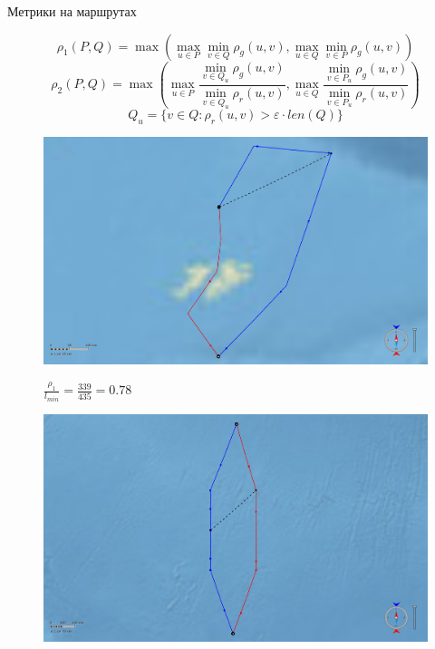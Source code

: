\documentclass[russian, hyperref={unicode}]{beamer}
\begin{document}
\begin{frame}[t]{Метрики на маршрутах}
     {
        \begin{figure}[c]
            \begin{equation*}
                \rho_1 (P, Q) = \max(\max_{u \in P} \min_{v \in Q} \rho_g(u,
                v), \max_{u \in Q} \min_{v \in P} \rho_g(u, v))
            \end{equation*}
            \begin{equation*}
                \rho_2 (P, Q) = \max(\max_{u \in P} \frac{\min\limits_{v \in Q_u}
                \rho_g(u, v)}{\min\limits_{v \in Q_u} \rho_r(u, v)}, \max\limits_{u \in Q} \frac{\min\limits_{v \in P_u}
                \rho_g(u, v)}{\min\limits_{v \in P_u} \rho_r(u, v)})
            \end{equation*}
            \begin{equation*}
                Q_u = \{ v \in Q : \rho_r(u, v) > \varepsilon \cdot len(Q) \}
            \end{equation*}
        \end{figure}
    }
     {
        \begin{figure}
            \includegraphics[width=.9\textwidth]{Solution/metrics/1-dissimilar}
            
            $\frac{\rho_1}{l_{min}} = \frac{339}{435} = 0.78$
        \end{figure}
    }
     {
        \begin{figure}
            \includegraphics[width=.9\textwidth]{Solution/metrics/1-uncertain-2-similar}
            

\end{figure}}
\end{frame}
\end{document}
